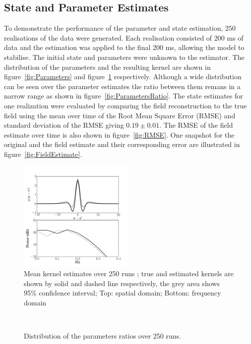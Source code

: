 \documentclass[12pt]{iopart}
\begin{document}
\subsection{State and Parameter Estimates} To demonstrate the performance of the parameter and state estimation, $250$ realisations of the data were generated. Each realisation consisted of 200 ms of data and the estimation was applied to the final 200 ms, allowing the model to stabilise. The initial state and parameters were unknown to the estimator. The distribution of the parameters and the resulting kernel are shown in figure~\ref{fig:Parameters} and figure~\ref{fig:KernelEstimates} respectively. Although a wide distribution can be seen over the parameter estimates the ratio between them remans in a narrow range as shown in figure~\ref{fig:ParametersRatio}. The state estimates for one realization were evaluated by comparing the field reconstruction to the true field using the mean over time of the Root Mean Square Error (RMSE) and standard deviation of the RMSE giving $0.19\pm 0.01$. The RMSE of the field estimate over time is also shown in figure~\ref{fig:RMSE}. One snapshot for the original and the field estimate and their corresponding error are illustrated in figure~\ref{fig:FieldEstimate}.
\begin{figure}
\includegraphics[width=0.5\textwidth]{./Graph/KernelEstimate_KernelFreqResponse.pdf}
\caption{Mean kernel estimates over 250 runs ;  true and estimated kernels are shown by solid
and dashed line respectively, the grey area shows 95\% confidence interval; Top: spatial domain; Bottom: frequency domain}
\label{fig:KernelEstimates}
\end{figure}
\begin{figure}[th]
\\
\caption{Distribution of the parameters ratios over 250 runs.}
\end{figure}
\end{document}
